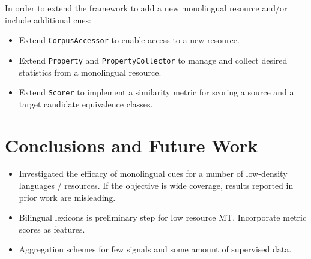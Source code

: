 \documentclass{article}
\begin{document}
In order to extend the framework to add a new monolingual resource and/or include additional cues:

\begin{itemize}
  \item Extend \small{\tt CorpusAccessor} to enable access to a new resource.
  \item Extend \small{\tt Property} and \small{\tt PropertyCollector} to manage and collect desired statistics from a monolingual resource.
  \item Extend \small{\tt Scorer} to implement a similarity metric for scoring a source and a target candidate equivalence classes.
\end{itemize}

\newpage

\newpage

\section{Conclusions and Future Work}

\begin{itemize}
  \item Investigated the efficacy of monolingual cues for a number of low-density languages / resources. If the objective is wide coverage, results reported in prior work are misleading.
  \item Bilingual lexicons is preliminary step for low resource MT.  Incorporate metric scores as features.
  \item Aggregation schemes for few signals and some amount of supervised data.
\end{itemize}




 
\end{document}
